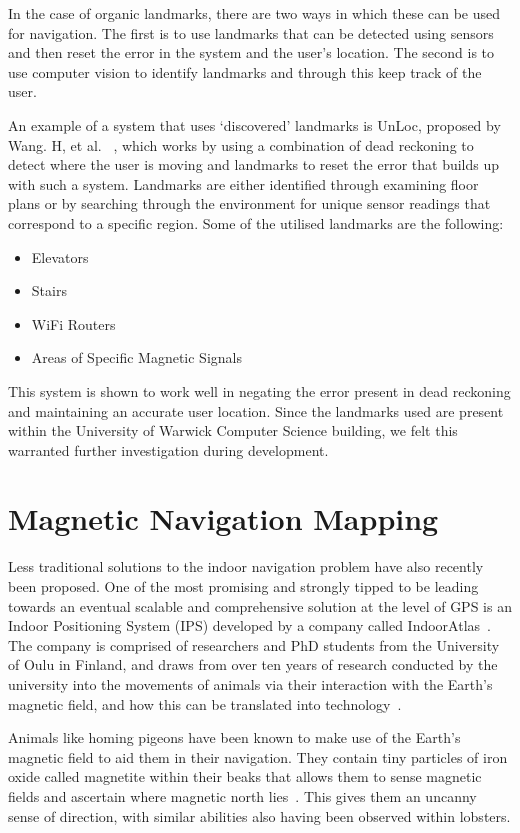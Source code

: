 \documentclass[12pt,a4paper]{report}
\begin{document}
In the case of organic landmarks, there are two ways in which these can be used for navigation. The first is to use landmarks that can be detected using sensors and then reset the error in the system and the user's location. The second is to use computer vision to identify landmarks and through this keep track of the user.

An example of a system that uses `discovered' landmarks is UnLoc, proposed by Wang. H, et al. ~\cite{wang2012no}, which works by using a combination of dead reckoning to detect where the user is moving and landmarks to reset the error that builds up with such a system. Landmarks are either identified through examining floor plans or by searching through the environment for unique sensor readings that correspond to a specific region. Some of the utilised landmarks are the following:

\begin{itemize}
	\item Elevators
	\item Stairs
	\item WiFi Routers
	\item Areas of Specific Magnetic Signals
\end{itemize}

This system is shown to work well in negating the error present in dead reckoning and maintaining an accurate user location. Since the landmarks used are present within the University of Warwick Computer Science building, we felt this warranted further investigation during development.

\section{Magnetic Navigation Mapping}
 
Less traditional solutions to the indoor navigation problem have also recently been proposed. One of the most promising and strongly tipped to be leading towards an eventual scalable and comprehensive solution at the level of GPS is an Indoor Positioning System (IPS) developed by a company called IndoorAtlas~\cite{indoorAtlas}. The company is comprised of researchers and PhD students from the University of Oulu in Finland, and draws from over ten years of research conducted by the university into the movements of animals via their interaction with the Earth's magnetic field, and how this can be translated into technology~\cite{IAReport}.
 
Animals like homing pigeons have been known to make use of the Earth's magnetic field to aid them in their navigation. They contain tiny particles of iron oxide called magnetite within their beaks that allows them to sense magnetic fields and ascertain where magnetic north lies~\cite{pigeon}. This gives them an uncanny sense of direction, with similar abilities also having been observed within lobsters. 
 
\end{document}
